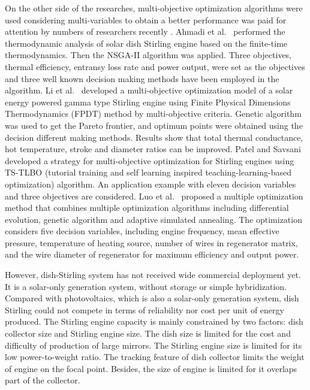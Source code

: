 \documentclass[review,3p,10t]{elsarticle}
\begin{document}
On the other side of the researches, multi-objective optimization algorithms were used considering multi-variables to obtain a better performance was paid for attention by numbers of researchers recently%
.
Ahmadi et al.~\cite{Ahmadi2016} performed the thermodynamic analysis of solar dish Stirling engine based on the finite-time thermodynamics. Then the NSGA-II algorithm was applied. Three objectives, thermal efficiency, entransy loss rate and power output, were set as the objectives and three well known decision making methods have been employed in the algorithm.
Li et al.~\cite{Li2016b} developed a multi-objective optimization model of a solar energy powered gamma type Stirling engine using Finite Physical Dimensions Thermodynamics (FPDT) method by multi-objective criteria. Genetic algorithm was used to get the Pareto frontier, and optimum points were obtained using the decision different making methods. Results show that total thermal conductance, hot temperature, stroke and diameter ratios can be improved.
Patel and Savsani~\cite{Patel2016} developed a strategy for multi-objective optimization for Stirling engines using TS-TLBO (tutorial training and self learning inspired teaching-learning-based optimization) algorithm. An application example with eleven decision variables and three objectives are considered. 
Luo et al.~\cite{Luo2016} proposed a multiple optimization method that combines multiple optimization algorithms including differential evolution, genetic algorithm and adaptive simulated annealing. The optimization considers five decision variables, including engine frequency, mean effective pressure, temperature of heating source, number of wires in regenerator matrix, and the wire diameter of regenerator for maximum efficiency and output power.



However, dish-Stirling system has not received wide commercial deployment yet. It is a solar-only generation system, without storage or simple hybridization. Compared with photovoltaics, which is also a solar-only generation system, dish Stirling could not compete in terms of reliability nor cost per unit of energy produced. The Stirling engine capacity is mainly constrained by two factors: dish collector size and Stirling engine size. The dish size is limited for the cost and difficulty of production of large mirrors. The Stirling engine size is limited for its low power-to-weight ratio. The tracking feature of dish collector limits the weight of engine on the focal point. Besides, the size of engine is limited for it overlaps part of the collector.
\end{document}
